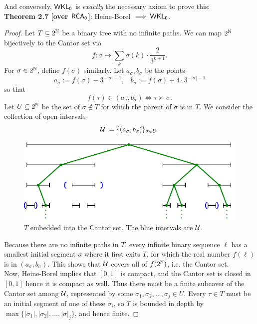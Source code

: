 \documentclass{amsart}
\begin{document}
	And conversely, $\operatorname{\sf{WKL_0}}$ is \textit{exactly} the necessary axiom to prove this:\\
	
	\noindent \textbf{Theorem 2.7 [over $\operatorname{\sf{RCA_0}}$]}: Heine-Borel $\implies \operatorname{\sf{WKL_0}}$.
	\begin{proof}
		Let $T\subseteq 2^{\mathbb{N}}$ be a binary tree with no infinite paths. We can map $2^{\mathbb{N}}$ bijectively to the Cantor set via
		$$
		f:\sigma \mapsto \sum_{k} \sigma(k)\cdot \frac{2}{3^{k+1}}.
		$$
		For $\sigma\in 2^{\mathbb{N}}$, define $f(\sigma)$ similarly. Let $a_{\sigma},b_{\sigma}$ be the points 
		$$
		a_{\sigma} := f(\sigma) - 3^{-|\sigma|-1}, \;\;\; b_{\sigma} := f(\sigma) + 4\cdot 3^{-|\sigma|-1}
		$$
		so that 
		$$f(\tau) \in (a_{\sigma},b_{\sigma}) \iff \tau\succ \sigma.$$ 
		Let $U\subseteq 2^{\mathbb{N}}$ be the set of $\sigma\not\in T$ for which the parent of $\sigma$ is in $T$. We consider the collection of open intervals
		$$
		\mathcal{U} := \{(a_{\sigma},b_{\sigma})\}_{\sigma\in U}.
		$$
		\begin{figure}[h]
			\includegraphics{Figures/CantorSet.pdf}
			\caption{$T$ embedded into the Cantor set. The blue intervals are $\mathcal{U}$.}
		\end{figure}
	
		Because there are no infinite paths in $T$, every infinite binary sequence $\ell$ has a smallest initial segment $\sigma$ where it first exits $T$, for which the real number $f(\ell)$ is in $(a_{\sigma},b_{\sigma})$. This shows that $\mathcal{U}$ covers all of $f(2^{\mathbb{N}})$, i.e. the Cantor set.\\
		
		Now, Heine-Borel implies that $[0,1]$ is compact, and the Cantor set is closed in $[0,1]$ hence it is compact as well. Thus there must be a finite subcover of the Cantor set among $\mathcal{U}$, represented by some $\sigma_1,\sigma_2,\dots,\sigma_j\in U$. Every $\tau\in T$ must be an initial segment of one of these $\sigma_i$, so $T$ is bounded in depth by $\max\{|\sigma_1|,|\sigma_2|,\dots,|\sigma|_j\}$, and hence finite.
	\end{proof}\\
	
\end{document}
